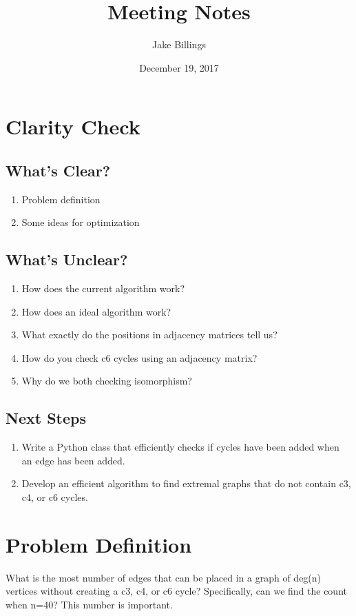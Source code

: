 \documentclass{article}
\title{Meeting Notes}
\author{Jake Billings}
\date{December 19, 2017}
\begin{document}
\maketitle

\section{Clarity Check}

\subsection{What's Clear?}
\begin{enumerate}
	\item Problem definition
	\item Some ideas for optimization
\end{enumerate}

\subsection{What's Unclear?}
\begin{enumerate}
	\item How does the current algorithm work?
	\item How does an ideal algorithm work?
	\item What exactly do the positions in adjacency matrices tell us?
	\item How do you check c6 cycles using an adjacency matrix?
	\item Why do we both checking isomorphism?
\end{enumerate}

\subsection{Next Steps}
\begin{enumerate}
	\item Write a Python class that efficiently checks if cycles have been added when an edge has been added.
	\item Develop an efficient algorithm to find extremal graphs that do not contain c3, c4, or c6 cycles.
\end{enumerate}

\section{Problem Definition}
What is the most number of edges that can be placed in a graph of deg(n) vertices without creating a c3, c4, or c6 cycle? Specifically, can we find the count when n=40? This number is important.
\end{document}
